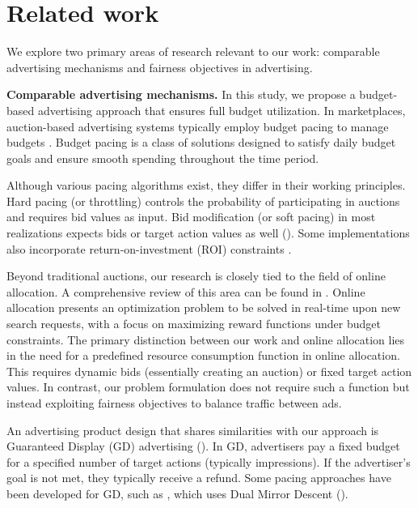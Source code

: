 \section{Related work}
We explore two primary areas of research relevant to our work: comparable advertising mechanisms and fairness objectives in advertising.

\textbf{Comparable advertising mechanisms.} In this study, we propose a budget-based advertising approach that ensures full budget utilization. In marketplaces, auction-based advertising systems typically employ budget pacing to manage budgets \cite{Chen2024, Nguyen2023PracticalBP}. Budget pacing is a class of solutions designed to satisfy daily budget goals and ensure smooth spending throughout the time period.

Although various pacing algorithms exist, they differ in their working principles. Hard pacing (or throttling) \cite{Agarwal2014, Karande2013, Nguyen2023PracticalBP} controls the probability of participating in auctions and requires bid values as input. Bid modification (or soft pacing) in most realizations expects bids or target action values as well (\cite{Stram2024, Chen2024}). Some implementations also incorporate return-on-investment (ROI) constraints \cite{Lucier2023AutobiddersWB}.

Beyond traditional auctions, our research is closely tied to the field of online allocation. A comprehensive review of this area can be found in \cite{balseiro2020}. Online allocation presents an optimization problem to be solved in real-time upon new search requests, with a focus on maximizing reward functions under budget constraints. The primary distinction between our work and online allocation lies in the need for a predefined resource consumption function in online allocation. This requires dynamic bids (essentially creating an auction) or fixed target action values. In contrast, our problem formulation does not require such a function but instead exploiting fairness objectives to balance traffic between ads.

An advertising product design that shares similarities with our approach is Guaranteed Display (GD) advertising (\cite{Yang2010InventoryAF}). In GD, advertisers pay a fixed budget for a specified number of target actions (typically impressions). If the advertiser's goal is not met, they typically receive a refund. Some pacing approaches have been developed for GD, such as \cite{dai2024}, which uses Dual Mirror Descent (\cite{balseiro2020}).

